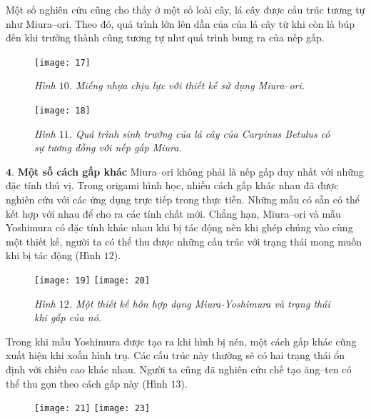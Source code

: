 \begin{multicols}{2}
	\vskip 0.1cm
	Một số nghiên cứu cũng cho thấy ở một số loài cây, lá cây được cấu trúc tương tự như Miura--ori. Theo đó, quá trình lớn lên dần của của lá cây từ khi còn là búp đến khi trưởng thành cũng tương tự như quá trình bung ra của nếp gấp.  
	\begin{figure}[H]
		\vspace*{-5pt}
		\centering
		\captionsetup{labelformat= empty, justification=centering}
		\texttt{[image: 17]}
		\caption{\small\textit{\color{toanhocdoisong}Hình $10$. Miếng nhựa chịu lực với thiết kế sử dụng Miura--ori.}}
		\vspace*{-5pt}
	\end{figure}
	\begin{figure}[H]
		\vspace*{5pt}
		\centering
		\captionsetup{labelformat= empty, justification=centering}
		\texttt{[image: 18]}
		\caption{\small\textit{\color{toanhocdoisong}Hình $11$. Quá trình sinh trưởng của lá cây của Carpinus Betulus có sự tương đồng với nếp gấp Miura.}}
		\vspace*{-10pt}
	\end{figure}
	$\pmb{4.}$ \textbf{\color{toanhocdoisong}Một số cách gấp khác}
	\vskip 0.1cm
	Miura--ori không phải là nếp gấp duy nhất với những đặc tính thú vị. Trong origami \linebreak hình học, nhiều cách gấp khác nhau đã được nghiên cứu với các ứng dụng trực tiếp trong thực tiễn. 
	\vskip 0.1cm
	Những mẫu có sẵn có thể kết hợp với nhau để cho ra các tính chất mới. Chẳng hạn, Miura--ori và mẫu Yoshimura có đặc tính khác nhau khi bị tác động nên khi ghép chúng vào cùng một thiết kế, người ta có thể thu được những cấu trúc với trạng thái mong muốn khi bị tác động (Hình $12$).
	\begin{figure}[H]
		\vspace*{-5pt}
		\centering
		\captionsetup{labelformat= empty, justification=centering}
		\texttt{[image: 19]}
		\texttt{[image: 20]}
		\caption{\small\textit{\color{toanhocdoisong}Hình $12$. Một thiết kế hỗn hợp dạng Miura-Yoshimura và trạng thái khi gấp của nó.}}
		\vspace*{-10pt}
	\end{figure}
	Trong khi mẫu Yoshimura được tạo ra khi \linebreak hình bị nén, một cách gấp khác cũng xuất hiện khi xoắn hình trụ. Các cấu trúc  này thường sẽ có hai trạng thái ổn định với chiều cao khác nhau. Người ta cũng đã nghiên cứu chế tạo ăng--ten có thể thu gọn theo cách gấp này (Hình $13$).
	\begin{figure}[H]
		\vspace*{5pt}
		\centering
		\captionsetup{labelformat= empty, justification=centering}
		\texttt{[image: 21]}
		\texttt{[image: 23]}
		

\end{figure}
\end{multicols}
